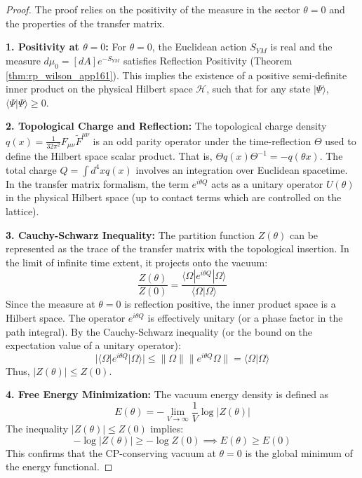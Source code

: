 \begin{proof}
The proof relies on the positivity of the measure in the sector $\theta=0$ and the properties of the transfer matrix.

\textbf{1. Positivity at $\theta=0$:}
For $\theta=0$, the Euclidean action $S_{YM}$ is real and the measure $d\mu_0 = [dA] e^{-S_{YM}}$ satisfies Reflection Positivity (Theorem \ref{thm:rp_wilson_app161}). This implies the existence of a positive semi-definite inner product on the physical Hilbert space $\mathcal{H}$, such that for any state $|\Psi\rangle$, $\langle \Psi | \Psi \rangle \ge 0$.

\textbf{2. Topological Charge and Reflection:}
The topological charge density $q(x) = \frac{1}{32\pi^2} F_{\mu\nu}\tilde{F}^{\mu\nu}$ is an odd parity operator under the time-reflection $\Theta$ used to define the Hilbert space scalar product. That is, $\Theta q(x) \Theta^{-1} = -q(\theta x)$. The total charge $Q = \int d^4x q(x)$ involves an integration over Euclidean spacetime. In the transfer matrix formalism, the term $e^{i\theta Q}$ acts as a unitary operator $U(\theta)$ in the physical Hilbert space (up to contact terms which are controlled on the lattice).

\textbf{3. Cauchy-Schwarz Inequality:}
The partition function $Z(\theta)$ can be represented as the trace of the transfer matrix with the topological insertion. In the limit of infinite time extent, it projects onto the vacuum:
\begin{equation}
\frac{Z(\theta)}{Z(0)} = \frac{\langle \Omega | e^{i\theta Q} | \Omega \rangle}{\langle \Omega | \Omega \rangle}
\end{equation}
Since the measure at $\theta=0$ is reflection positive, the inner product space is a Hilbert space. The operator $e^{i\theta Q}$ is effectively unitary (or a phase factor in the path integral). By the Cauchy-Schwarz inequality (or the bound on the expectation value of a unitary operator):
\begin{equation}
|\langle \Omega | e^{i\theta Q} | \Omega \rangle| \le \| \Omega \| \| e^{i\theta Q} \Omega \| = \langle \Omega | \Omega \rangle
\end{equation}
Thus, $|Z(\theta)| \le Z(0)$.

\textbf{4. Free Energy Minimization:}
The vacuum energy density is defined as
\begin{equation}
E(\theta) = -\lim_{V \to \infty} \frac{1}{V} \log |Z(\theta)|
\end{equation}
The inequality $|Z(\theta)| \le Z(0)$ implies:
\begin{equation}
-\log |Z(\theta)| \ge -\log Z(0) \implies E(\theta) \ge E(0)
\end{equation}
This confirms that the CP-conserving vacuum at $\theta=0$ is the global minimum of the energy functional.
\end{proof}

